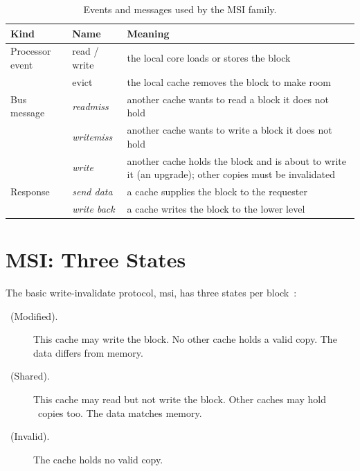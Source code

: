 \begin{table}[htbp]
\centering
\caption{Events and messages used by the MSI family.}
\label{tab:events}
\small
\begin{tabular}{@{}l l p{7.6cm}@{}}
\toprule
Kind & Name & Meaning \\
\midrule
Processor event & read / write & the local core loads or stores the block \\
 & evict & the local cache removes the block to make room \\
\midrule
Bus message & \textit{readmiss} & another cache wants to read a block it does not hold \\
 & \textit{writemiss} & another cache wants to write a block it does not hold \\
 & \textit{write} & another cache holds the block and is about to write it
   (an upgrade); other copies must be invalidated \\
\midrule
Response & \textit{send data} & a cache supplies the block to the requester \\
 & \textit{write back} & a cache writes the block to the lower level \\
\bottomrule
\end{tabular}
\end{table}

\section{MSI: Three States}
\label{sec:fam-msi}
%

The basic write-invalidate protocol, \gls{msi}, has three states per
block~\cite[\S12.4.6]{sarangi2025basic}:

\begin{description}
  \item[\stM\ (Modified).] This cache may write the block. No other cache
    holds a valid copy. The data differs from memory.
  \item[\stS\ (Shared).] This cache may read but not write the block. Other
    caches may hold \stS\ copies too. The data matches memory.
  \item[\stI\ (Invalid).] The cache holds no valid copy.
\end{description}

